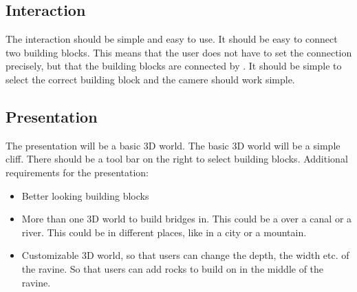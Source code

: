 \subsection{Interaction}
The interaction should be simple and easy to use. It should be easy to connect two building blocks. This means that the user does not have to set the connection precisely, but that the building blocks are connected by \name. It should be simple to select the correct building block and the camere should work simple.


\subsection{Presentation}
The presentation will be a basic 3D world. The basic 3D world will be a simple cliff. There should be a tool bar on the right to select building blocks.
Additional requirements for the presentation:
 \begin{itemize}
 \item Better looking building blocks
 \item More than one 3D world to build bridges in. This could be a over a canal or a river. This could be in different places, like in a city or a mountain.
 \item Customizable 3D world, so that users can change the depth, the width etc. of the ravine. So that users can add rocks to build on in the middle of the ravine.
 \end{itemize}